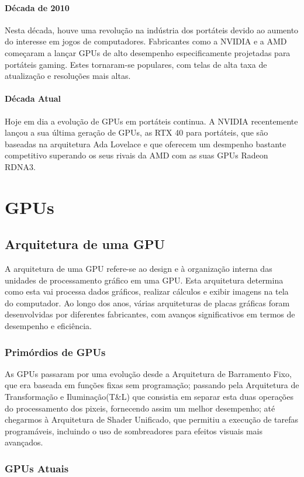 \documentclass[a4paper,11pt,]{report}
\begin{document}
\subsection{Década de 2010}
Nesta década, houve uma revolução na indústria dos portáteis devido ao aumento do interesse em jogos de computadores. Fabricantes como a NVIDIA e a AMD começaram a lançar GPUs de alto desempenho especificamente projetadas para portáteis gaming. Estes tornaram-se populares, com telas de alta taxa de atualização e resoluções mais altas.
\subsection{Década Atual}
Hoje em dia a evolução de GPUs em portáteis continua. A NVIDIA recentemente lançou a sua última geração de GPUs, as RTX 40 para portáteis, que são baseadas na arquitetura Ada Lovelace e que oferecem um desmpenho bastante competitivo superando os seus rivais da AMD com as suas GPUs Radeon RDNA3.

\part{GPUs}

\chapter{Arquitetura de uma GPU}
A arquitetura de uma GPU refere-se ao design e à organização interna das unidades de processamento gráfico em uma GPU. Esta arquitetura determina como esta vai processa dados gráficos, realizar cálculos e exibir imagens na tela do computador. Ao longo dos anos, várias arquiteturas de placas gráficas foram desenvolvidas por diferentes fabricantes, com avanços significativos em termos de desempenho e eficiência.

\section{Primórdios de GPUs}
As GPUs passaram por uma evolução desde a Arquitetura de Barramento Fixo, que era baseada em funções fixas sem programação; passando pela Arquitetura de Transformação e Iluminação(T\&L) que consistia em separar esta duas operações do processamento dos pixeis, fornecendo assim um melhor desempenho; até chegarmos à Arquitetura de Shader Unificado, que permitiu a execução de tarefas programáveis, incluindo o uso de sombreadores para efeitos visuais mais avançados.
\section{GPUs Atuais}
\end{document}
